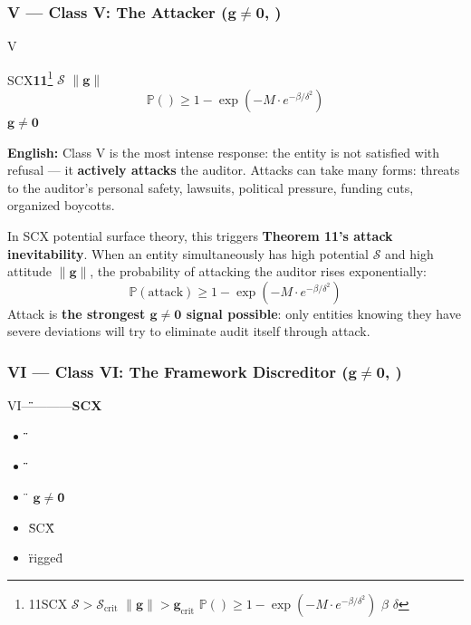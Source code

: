 \documentclass[12pt,a4paper]{article}
\theoremstyle{remark}
\newcommand{\Pbb}{\mathbb{P}}
\newcommand{\g}{\mathbf{g}}
\begin{document}
\subsubsection{V — Class V: The Attacker ($ \g \neq \mathbf{0} $, )}

\noindent
\textbf{} V\textbf{}

SCX\textbf{11}\footnote{11SCX $\mathcal{S} > \mathcal{S}_{\text{crit}}$  $\|\g\| > \g_{\text{crit}}$ $\Pbb(\text{}) \geq 1 - \exp(-M \cdot e^{-\beta/\delta^2})$ $\beta$ $\delta$ } $ \mathcal{S} $  $ \| \g \| $ 
\begin{equation}
    \Pbb(\text{}) \geq 1 - \exp\left(-M \cdot e^{-\beta/\delta^2}\right)
\end{equation}
\textbf{$ \g \neq \mathbf{0} $ }

\vspace{4pt}
\noindent
\textbf{English:} Class V is the most intense response: the entity is not satisfied with refusal — it \textbf{actively attacks} the auditor. Attacks can take many forms: threats to the auditor's personal safety, lawsuits, political pressure, funding cuts, organized boycotts.

In SCX potential surface theory, this triggers \textbf{Theorem 11's attack inevitability}. When an entity simultaneously has high potential $ \mathcal{S} $ and high attitude $ \| \g \| $, the probability of attacking the auditor rises exponentially:
\begin{equation}
    \Pbb(\text{attack}) \geq 1 - \exp\left(-M \cdot e^{-\beta/\delta^2}\right)
\end{equation}
Attack is \textbf{the strongest $ \g \neq \mathbf{0} $ signal possible}: only entities knowing they have severe deviations will try to eliminate audit itself through attack.

\subsubsection{VI — Class VI: The Framework Discreditor ($ \g \neq \mathbf{0} $, )}

\noindent
\textbf{} VI\"\"————\textbf{SCX}

\begin{itemize}
    \item \"\"
    \item \"\"
    \item \" $ \g \neq \mathbf{0} $\"
    \item \"SCX\"
    \item \" rigged\"
\end{itemize}
\end{document}
